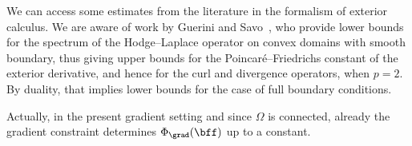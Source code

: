 We can access some estimates from the literature in the formalism of exterior calculus. 
We are aware of work by Guerini and Savo~\cite{guerini2004eigenvalue},
who provide lower bounds for the spectrum of the Hodge--Laplace operator on convex domains with smooth boundary, %
thus giving upper bounds for the Poincar\'e--Friedrichs constant of the exterior derivative, and hence for the curl and divergence operators, when $p=2$.
By duality, that implies lower bounds for the case of full boundary conditions.




Actually, in the present gradient setting and since $\Omega$ is connected, already the gradient constraint determines $\Phi_{\grad}( \bff )$ up to a constant. 
